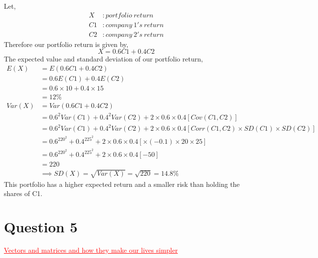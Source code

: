 \documentclass[12pt]{report}
\begin{document}
\noindent Let,
\begin{align*}
	X&: portfolio\ return \\
	C1&: company\ 1's\ return \\
	C2&: company\ 2's\ return
\end{align*}
\noindent Therefore our portfolio return is given by,
$$X=0.6C1 + 0.4C2$$
\noindent The expected value and standard deviation of our portfolio return,
\begin{align*}
	E(X)&=E(0.6C1 + 0.4C2) \\
	&= 0.6E(C1) + 0.4E(C2) \\
	&= 0.6\times 10 + 0.4\times 15 \\
	&= 12\% \\
	Var(X)&=Var(0.6C1 + 0.4C2) \\
	&= 0.6^2Var(C1) + 0.4^2Var(C2) + 2\times 0.6\times 0.4[Cov(C1,C2)] \\
	&= 0.6^2Var(C1) + 0.4^2Var(C2) + 2\times 0.6\times 0.4[Corr(C1,C2)\times SD(C1) \times SD(C2)] \\
	&= 0.6^220^2 + 0.4^225^2 + 2\times 0.6\times 0.4[\times (-0.1)\times 20 \times 25] \\
	&= 0.6^220^2 + 0.4^225^2 + 2\times 0.6\times 0.4[-50] \\
	&= 220 \\
	&\implies SD(X) = \sqrt{Var(X)} = \sqrt{220} = 14.8\%
\end{align*}
\noindent This portfolio has a higher expected return and a smaller risk than holding the shares of C1.

\newpage
\section*{Question 5}
\textcolor{red}{\underline{Vectors and matrices and how they make our lives simpler}}
\end{document}
